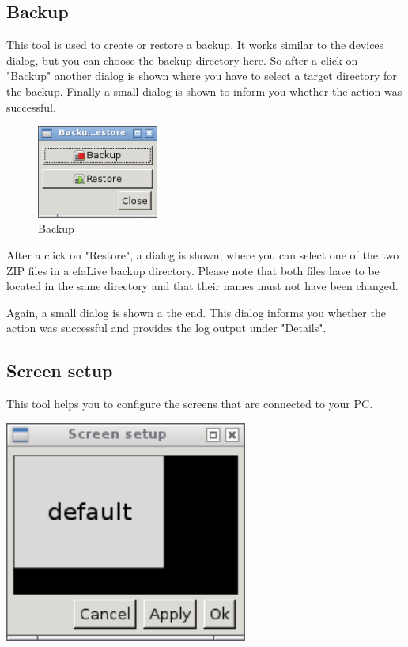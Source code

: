 \documentclass[a4paper,12pt,twoside]{article}
\begin{document}
\subsection{Backup}
\label{sct:dialog_backup}
This tool is used to create or restore
a backup. It works similar to the devices dialog, but you can choose
the backup directory here. So after a click on
"Backup" another dialog is shown where you
have to select a target directory for the backup. Finally a small
dialog is shown to inform you whether the action was successful.

\begin{figure}
    \centering
    \includegraphics[width=4cm]{efaLiveen-img/efaLiveen-img22.png}
    \caption{Backup}
    \label{fig:dialog_backup}
\end{figure}

After a click on "Restore", a dialog is
shown, where you can select one of the two ZIP files in a efaLive
backup directory. Please note that both files have to be located in the
same directory and that their names must not have been changed.

Again, a small dialog is shown a the end. This dialog informs you
whether the action was successful and provides the log output under
"Details".


\subsection{Screen setup}
\label{sct:screen_setup}
This tool helps you to configure the screens that are connected to your
PC.

\begin{minipage}{\linewidth}
    \centering
    \includegraphics[width=8cm]{efaLiveen-img/efaLiveen-img23.png}
    \label{fig:screen_setup}
\end{minipage}
\end{document}
